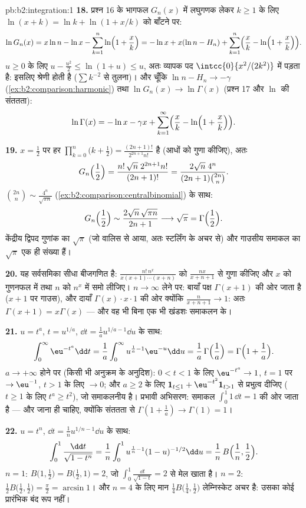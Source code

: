 \begin{solution}{pb:b2:integration:1}
\textbf{18.} प्रश्न 16 के भागफल $G_n(x)$ में लघुगणक लेकर $k
\geq 1$ के लिए $\ln(x+k) = \ln k + \ln(1 + x/k)$ को
बाँटने पर:
\[
\ln G_n(x) = x\ln n - \ln x - \sum_{k=1}^n
\ln\Bigl(1+\frac xk\Bigr)
= -\ln x + x(\ln n - H_n)
+ \sum_{k=1}^n\Bigl(\frac xk -
\ln\Bigl(1+\frac xk\Bigr)\Bigr).
\]
$u \geq 0$ के लिए $u - \frac{u^2}2 \leq \ln(1+u) \leq u$, अतः व्यापक पद $\intcc{0}{x^2/(2k^2)}$ में पड़ता है: इसलिए श्रेणी 
होती है ($\sum k^{-2}$ से तुलना)। और चूँकि $\ln n - H_n
\to -\gamma$ (\cref{ex:b2:comparison:harmonic}) तथा $\ln G_n(x)
\to \ln\Gamma(x)$ (प्रश्न 17 और $\ln$
की संततता):
\[
\ln\Gamma(x) = -\ln x - \gamma x
+ \sum_{k=1}^\infty\Bigl(\frac xk -
\ln\Bigl(1+\frac xk\Bigr)\Bigr) .
\]

\textbf{19.} $x = \frac12$ पर हर $\prod_{k=0}^n\bigl(k+\frac12\bigr) =
\frac{(2n+1)!}{2^{2n+1}n!}$ है (आधों को गुणा कीजिए), अतः
\[
G_n\Bigl(\frac12\Bigr)
= \frac{n!\,\sqrt n\;2^{2n+1}n!}{(2n+1)!}
= \frac{2\sqrt n\;4^n}{(2n+1)\binom{2n}{n}} .
\]
$\binom{2n}{n} \sim \frac{4^n}{\sqrt{\pi n}}$ (\cref{ex:b2:comparison:centralbinomial}) के साथ:
\[
G_n\Bigl(\frac12\Bigr)
\sim \frac{2\sqrt n\,\sqrt{\pi n}}{2n+1}
\longrightarrow \sqrt\pi = \Gamma\Bigl(\frac12\Bigr) .
\]
केंद्रीय द्विपद गुणांक का $\sqrt\pi$ (जो वालिस से आया, अतः स्टर्लिंग के अचर से)
और गाउसीय समाकल का $\sqrt\pi$ एक ही संख्या हैं।

\textbf{20.} यह सर्वसमिका सीधा बीजगणित है: $\frac{n!\,n^x}{x(x+1)\cdots(x+n)}$ को $\frac{nx}{x+n+1}$ से गुणा कीजिए और
$x$ को गुणनफल में तथा $n$ को $n^x$ में समो लीजिए। $n \to
\infty$ लेने पर: बायाँ पक्ष
$\Gamma(x+1)$ की ओर जाता है ($x+1$ पर गाउस), और दायाँ $\Gamma(x)\cdot x\cdot 1$ की ओर क्योंकि $\frac{n}{x+n+1} \to 1$: अतः
$\Gamma(x+1) = x\Gamma(x)$ --- और वह भी बिना एक भी खंडशः समाकलन के।

\textbf{21.} $u = t^a$, $t = u^{1/a}$, $\dd t = \frac1a
u^{1/a - 1}\dd u$ के साथ:
\[
\int_0^\infty \eu^{-t^a}\dd t
= \frac1a\int_0^\infty u^{\frac1a - 1}\eu^{-u}\dd u
= \frac1a\,\Gamma\Bigl(\frac1a\Bigr)
= \Gamma\Bigl(1 + \frac1a\Bigr) .
\]
$a \to +\infty$ होने पर (किसी भी अनुक्रम के अनुदिश): $0 < t < 1$ के लिए $\eu^{-t^a} \to 1$, $t = 1$ पर $\to \eu^{-1}$,
$t > 1$ के लिए $\to 0$; और $a \geq 2$ के लिए $\mathbf 1_{t \leq 1} +
\eu^{-t^2}\mathbf 1_{t > 1}$ से प्रभुत्व दीजिए ($t \geq 1$ के लिए
$t^a \geq t^2$), जो समाकलनीय है। प्रभावी अभिसरण: समाकल $\int_0^1 1\,\dd t = 1$ की ओर जाता है ---
और जाना ही चाहिए, क्योंकि संततता से $\Gamma(1 +
\frac1a) \to \Gamma(1) = 1$।

\textbf{22.} $u = t^n$, $\dd t = \frac1n u^{1/n - 1}\dd
u$ के साथ:
\[
\int_0^1 \frac{\dd t}{\sqrt{1-t^n}}
= \frac1n\int_0^1 u^{\frac1n-1}(1-u)^{-1/2}\dd u
= \frac1n\,B\Bigl(\frac1n, \frac12\Bigr) .
\]
$n = 1$: $B\bigl(1,\frac12\bigr) = B\bigl(\frac12,1\bigr) = 2$, जो $\int_0^1\frac{\dd t}{\sqrt{1-t}} = 2$ से मेल खाता है। $n = 2$: $\frac12 B\bigl(\frac12,\frac12\bigr) = \frac\pi2 = \arcsin 1$। और $n = 4$ के लिए मान $\frac14 B\bigl(\frac14,\frac12\bigr)$
लेम्निस्केट अचर है: उसका कोई प्रारंभिक बंद रूप नहीं।


\end{solution}
